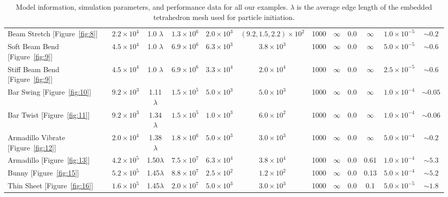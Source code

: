 \begin{table}[htb]
{\begin{tabular}{lccccccccccc}
  Beam Stretch [Figure~\ref{fig:8}]        & $2.2\times10^4$ & 1.0 $\lambda$ & $1.3\times10^6$ & $2.0\times10^3$   & $(9.2,1.5,2.2)\times10^2$& 1000 & $\infty$  & 0.0             &$\infty$  & $1.0\times10^{-5}$ & $\sim0.2$ \\
  Soft Beam Bend [Figure~\ref{fig:9}]      & $4.5\times10^4$ & 1.0 $\lambda$ & $6.9\times10^6$ & $6.3\times10^3$   & $3.8\times10^3$          & 1000 & $\infty $ & 0.0             & $\infty$ & $5.0\times10^{-5}$   & $\sim0.6$ \\
  Stiff Beam Bend [Figure~\ref{fig:9}]     & $4.5\times10^4$ & 1.0 $\lambda$ & $6.9\times10^6$ & $3.3\times10^4$   & $2.0\times10^4$          & 1000 & $\infty $ & 0.0             & $\infty$ & $2.5\times10^{-5}$ & $\sim0.6$ \\
  Bar Swing [Figure~\ref{fig:10}]     & $9.2\times10^3$ & 1.11 $\lambda$ & $1.5\times10^5$ & $5.0\times10^3$   & $5.0\times10^3$          & 1000 & $\infty $ & 0.0             & $\infty$ & $1.0\times10^{-4}$ & $\sim0.05$ \\
  Bar Twist [Figure~\ref{fig:11}]     & $9.2\times10^3$ & 1.34 $\lambda$ & $1.5\times10^5$ & $1.0\times10^3$   & $6.0\times10^2$          & 1000 & $\infty $ & 0.0             & $\infty$ & $1.0\times10^{-4}$ & $\sim0.06$ \\
  Armadillo Vibrate [Figure~\ref{fig:12}]     & $2.0\times10^4$ & 1.38 $\lambda$ & $1.8\times10^6$ & $5.0\times10^3$   & $3.0\times10^3$          & 1000 & $\infty $ & 0.0             & $\infty$ & $5.0\times10^{-4}$ & $\sim0.2$ \\
  Armadillo [Figure~\ref{fig:13}]          & $4.2\times10^5$ & 1.50$\lambda$ & $7.5\times10^7$ & $6.3\times10^4$   & $3.8\times10^4$          & 1000 & $\infty $ & 0.0             & 0.61     & $1.0\times10^{-4}$          & $\sim5.3$ \\
  Bunny [Figure~\ref{fig:15}]              & $5.2\times10^5$ & 1.45$\lambda$ & $8.8\times10^7$ & $2.5\times10^2$   & $1.2\times10^2$          & 1000 & $\infty $ & 0.0             & 0.13     & $5.0\times10^{-4}$          & $\sim5.2$ \\
  Thin Sheet [Figure~\ref{fig:16}]              & $1.6\times10^5$ & 1.45$\lambda$ & $2.0\times10^7$ & $5.0\times10^3$   & $3.0\times10^3$          & 1000 & $\infty $ & 0.0             & 0.1     & $5.0\times10^{-5}$          & $\sim1.8$ \\
  \hline
\end{tabular}
}
\caption{Model information, simulation parameters, and performance data for all our examples. $\lambda$ is the average edge length of the embedded tetrahedron mesh used for particle initiation.}
\label{tab:1}
\end{table}
